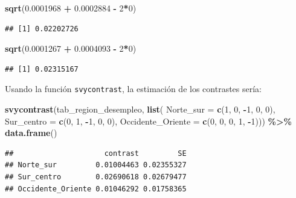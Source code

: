\documentclass[
  spanish,
  12pt,
]{book}
\newenvironment{Shaded}{\begin{snugshade}}{\end{snugshade}}
\newcommand{\AttributeTok}[1]{\textcolor[rgb]{0.13,0.29,0.53}{#1}}
\newcommand{\DecValTok}[1]{\textcolor[rgb]{0.00,0.00,0.81}{#1}}
\newcommand{\FloatTok}[1]{\textcolor[rgb]{0.00,0.00,0.81}{#1}}
\newcommand{\FunctionTok}[1]{\textcolor[rgb]{0.13,0.29,0.53}{\textbf{#1}}}
\newcommand{\NormalTok}[1]{#1}
\newcommand{\SpecialCharTok}[1]{\textcolor[rgb]{0.81,0.36,0.00}{\textbf{#1}}}
\begin{document}
\begin{Shaded}
\begin{Highlighting}[]
\FunctionTok{sqrt}\NormalTok{(}\FloatTok{0.0001968} \SpecialCharTok{+} \FloatTok{0.0002884} \SpecialCharTok{{-}} \DecValTok{2}\SpecialCharTok{*}\DecValTok{0}\NormalTok{)}
\end{Highlighting}
\end{Shaded}

\begin{verbatim}
## [1] 0.02202726
\end{verbatim}

\begin{Shaded}
\begin{Highlighting}[]
\FunctionTok{sqrt}\NormalTok{(}\FloatTok{0.0001267} \SpecialCharTok{+} \FloatTok{0.0004093} \SpecialCharTok{{-}} \DecValTok{2}\SpecialCharTok{*}\DecValTok{0}\NormalTok{)}
\end{Highlighting}
\end{Shaded}

\begin{verbatim}
## [1] 0.02315167
\end{verbatim}

Usando la función \texttt{svycontrast}, la estimación de los contrastes sería:

\begin{Shaded}
\begin{Highlighting}[]
\FunctionTok{svycontrast}\NormalTok{(tab\_region\_desempleo, }\FunctionTok{list}\NormalTok{(}
                             \AttributeTok{Norte\_sur =} \FunctionTok{c}\NormalTok{(}\DecValTok{1}\NormalTok{, }\DecValTok{0}\NormalTok{, }\SpecialCharTok{{-}}\DecValTok{1}\NormalTok{, }\DecValTok{0}\NormalTok{, }\DecValTok{0}\NormalTok{),}
                             \AttributeTok{Sur\_centro =} \FunctionTok{c}\NormalTok{(}\DecValTok{0}\NormalTok{, }\DecValTok{1}\NormalTok{, }\SpecialCharTok{{-}}\DecValTok{1}\NormalTok{, }\DecValTok{0}\NormalTok{, }\DecValTok{0}\NormalTok{),}
                             \AttributeTok{Occidente\_Oriente =} \FunctionTok{c}\NormalTok{(}\DecValTok{0}\NormalTok{, }\DecValTok{0}\NormalTok{, }\DecValTok{0}\NormalTok{, }\DecValTok{1}\NormalTok{, }\SpecialCharTok{{-}}\DecValTok{1}\NormalTok{))) }\SpecialCharTok{\%\textgreater{}\%} \FunctionTok{data.frame}\NormalTok{()}
\end{Highlighting}
\end{Shaded}

\begin{verbatim}
##                     contrast         SE
## Norte_sur         0.01004463 0.02355327
## Sur_centro        0.02690618 0.02679477
## Occidente_Oriente 0.01046292 0.01758365
\end{verbatim}
\end{document}
